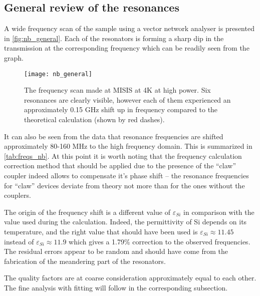 \documentclass[12pt]{article}
\numberwithin{equation}{section}
\numberwithin{figure}{section}
\begin{document}
\subsection{General review of the resonances}

A wide frequency scan of the sample using a vector network analyser is presented in \autoref{fig:nb_general}. Each of the resonators is forming a sharp dip in the transmission at the corresponding frequency which can be readily seen from the graph. 

\begin{figure}[h!]
\centering
\texttt{[image: nb\_general]}
\caption{The frequency scan made at MISIS at 4K at high power. Six resonances are clearly visible, however each of them experienced an approximately 0.15 GHz shift up in frequency compared to the theoretical calculation (shown by red dashes).}
\label{fig:nb_general}
\end{figure}

It can also be seen from the data that resonance frequencies are shifted approximately 80-160 MHz to the high frequency domain. This is summarized in \autoref{tab:freqs_nb}. At this point it is worth noting that the frequency calculation correction method\cite{Sank2014} that should be applied due to the presence of the ``claw'' coupler indeed allows to compensate it's phase shift -- the resonance frequencies for ``claw'' devices deviate from theory not more than for the ones without the couplers. 

The origin of the frequency shift is a different value of $\varepsilon_{Si}$ in comparison with the value used during the calculation. Indeed, the permittivity of Si depends on its temperature\cite{Krupka2007}, and the right value that should have been used is $\varepsilon_{Si} \approx 11.45$ instead of $\varepsilon_{Si} \approx 11.9$ which gives a 1.79\% correction to the observed frequencies. The residual errors appear to be random and should have come from the fabrication of the meandering part of the resonators.

The quality factors are at coarse consideration approximately equal to each other. The fine analysis with fitting will follow in the corresponding subsection. 
\end{document}
